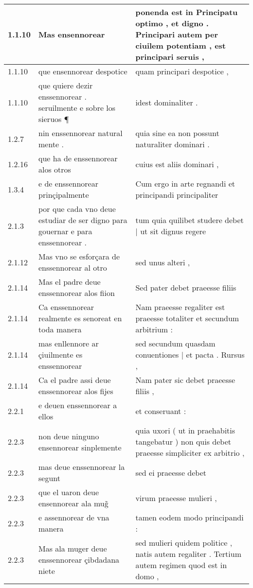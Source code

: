 \begin{tabular}{|p{1cm}|p{6.5cm}|p{6.5cm}|}

\hline
1.1.10 & Mas ensennorear & ponenda est in Principatu optimo , et digno . Principari autem per ciuilem potentiam , est principari seruis , \\\hline
1.1.10 & que ensennorear despotice & quam principari despotice , \\\hline
1.1.10 & que quiere dezir enssennorear . seruilmente e sobre los sieruos ¶ & idest dominaliter . \\\hline
1.2.7 & nin enssennorear natural mente . & quia sine ea non possunt naturaliter dominari . \\\hline
1.2.16 & que ha de enssennorear alos otros & cuius est aliis dominari , \\\hline
1.3.4 & e de enssennorear prinçipalmente & Cum ergo in arte regnandi et principandi principaliter \\\hline
2.1.3 & por que cada vno deue estudiar de ser digno para gouernar e para enssennorear . & tum quia quilibet studere debet | ut sit dignus regere \\\hline
2.1.12 & Mas vno se esforçara de enssennorear al otro & sed unus alteri , \\\hline
2.1.14 & Mas el padre deue enssennorear alos fiion & Sed pater debet praeesse filiis \\\hline
2.1.14 & Ca enssennorear realmente es senoreat en toda manera & Nam praeesse regaliter est praeesse totaliter et secundum arbitrium : \\\hline
2.1.14 & mas enllennore ar çiuilmente es enssennorear & sed secundum quasdam conuentiones | et pacta . Rursus , \\\hline
2.1.14 & Ca el padre assi deue enssennorear alos fijes & Nam pater sic debet praeesse filiis , \\\hline
2.2.1 & e deuen enssennorear a ellos & et conseruant : \\\hline
2.2.3 & non deue ninguno ensennorear sinplemente & quia uxori ( ut in praehabitis tangebatur ) non quis debet praeesse simpliciter ex arbitrio , \\\hline
2.2.3 & mas deue enssennorear la segunt & sed ei praeesse debet \\\hline
2.2.3 & que el uaron deue ensennorear ala mug̃ & virum praeesse mulieri , \\\hline
2.2.3 & e assennorear de vna manera & tamen eodem modo principandi : \\\hline
2.2.3 & Mas ala muger deue enssennorear çibdadana niete & sed mulieri quidem politice , natis autem regaliter . Tertium autem regimen quod est in domo , \\\hline

\end{tabular}
